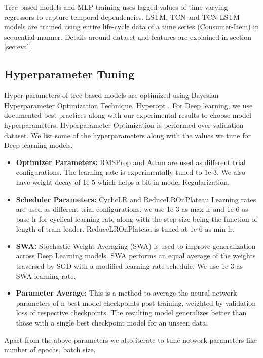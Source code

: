 Tree based models and MLP training uses lagged values of time varying regressors
to capture temporal dependencies. LSTM, TCN and TCN-LSTM models are trained using entire life-cycle data of a 
time series (Consumer-Item) in sequential manner. Details around dataset and features are explained in section \ref{sec:eval}. 

\subsection{Hyperparameter Tuning}
Hyper-parameters of tree based models are optimized
using Bayesian Hyperparameter Optimization Technique, Hyperopt \cite{bergstra2013hyperopt}. 
For Deep learning, we use documented best practices along with our experimental results to
choose model hyperparameters. Hyperparameter Optimization is performed over validation dataset. 
We list some of the hyperparameters along with the values we tune for Deep learning models.
  \begin{itemize}
    \item {\bf Optimizer Parameters:} RMSProp \cite{bengio2015rmsprop} and Adam are used as different trial configurations. 
    The learning rate is experimentally tuned to 1e-3. We also have weight decay of 1e-5 which helps a bit in model Regularization.
    \item {\bf Scheduler Parameters:} CyclicLR \cite{smith2017cyclical} and ReduceLROnPlateau \cite{zaheer2018adaptive} 
    Learning rates are used as different trial configurations.
    we use 1e-3 as max lr and 1e-6 as base lr for cyclical learning rate along with the step size being the function of
    length of train loader. ReduceLROnPlateau is tuned at 1e-6 as min lr.
    \item {\bf SWA:} Stochastic Weight Averaging (SWA) \cite{izmailov2018averaging} is used to improve generalization across Deep Learning
    models. SWA performs an equal average of the weights traversed by SGD with a modified learning rate schedule. We use 
    1e-3 as SWA learning rate.
    \item {\bf Parameter Average:} This is a method to average the neural network parameters of n best model checkpoints 
    post training, weighted by validation loss of respective checkpoints. The resulting model generalizes better than those 
    with a single best checkpoint model for an unseen data. 
  \end{itemize}
Apart from the above parameters we also iterate to tune network parameters like number of epochs, batch size, 
